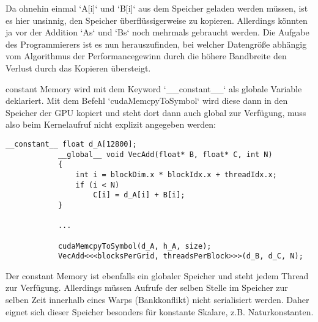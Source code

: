 		Da ohnehin einmal \li`A[i]` und \li`B[i]` aus dem Speicher geladen werden müssen, ist es hier unsinnig, den Speicher überflüssigerweise zu kopieren. Allerdings könnten ja vor der Addition \li`As` und \li`Bs` noch mehrmals gebraucht werden. Die Aufgabe des Programmierers ist es nun herauszufinden, bei welcher Datengröße abhängig vom Algorithmus der \Gls{Performance}gewinn durch die höhere Bandbreite den Verlust durch das Kopieren übersteigt.
		
		\Gls{constant Memory} wird mit dem Keyword \li`__constant__` als globale Variable deklariert. Mit dem Befehl \li`cudaMemcpyToSymbol` wird diese dann in den Speicher der GPU kopiert und steht dort dann auch global zur Verfügung, muss also beim \Gls{Kernel}aufruf nicht explizit angegeben werden:
		\begin{lstlisting}[caption=Vektoraddition constant Memory]
			__constant__ float d_A[12800];
			__global__ void VecAdd(float* B, float* C, int N)
			{
    			int i = blockDim.x * blockIdx.x + threadIdx.x;
    			if (i < N)
        			C[i] = d_A[i] + B[i];
			}
			
			...
			
			cudaMemcpyToSymbol(d_A, h_A, size);
			VecAdd<<<blocksPerGrid, threadsPerBlock>>>(d_B, d_C, N);
		\end{lstlisting}
		
		Der \gls{constant Memory} ist ebenfalls ein globaler Speicher und steht jedem \Gls{Thread} zur Verfügung. Allerdings müssen Aufrufe der selben Stelle im Speicher zur selben Zeit innerhalb eines \Glspl{Warp} (Bankkonflikt) nicht serialisiert werden. Daher eignet sich dieser Speicher besonders für konstante Skalare, z.B. Naturkonstanten.
		
